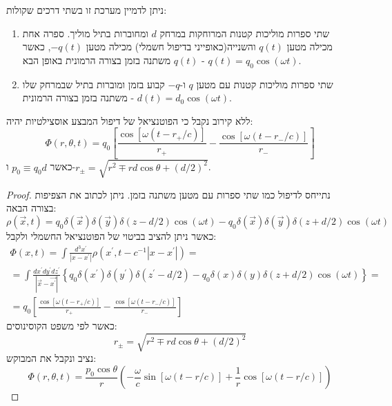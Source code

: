 \documentclass{tstextbook}
\begin{document}
\begin{definition}
ניתן לדמיין מערכת זו בשתי דרכים שקולות:

\end{definition}
\begin{enumerate}
  \item שתי ספרות מוליכות קטנות המרוחקות במרחק \(d\) ומחוברות בתיל מוליך. ספרה אחת מכילה מטען \(q(t)\) והשנייה(כאופייני בדיפול חשמלי) מכילה מטען \(-q(t)\), כאשר \(q(t)\) משתנה בזמן בצורה הרמונית באופן הבא - \(q(t)=q_{0}\cos\left( \omega t \right)\). 


  \item שתי ספרות מוליכות קטנות עם מטען \(q\) ו-\(-q\) קבוע בזמן ומוברות בתיל שבמרחק שלו משתנה בזמן בצורה הרמונית - \(d(t)=d_{0}\cos\left( \omega t \right)\). 


\end{enumerate}
\begin{proposition}
ללא קירוב נקבל כי הפוטנציאל של דיפול המבצע אוסצילטיות יהיה:
$$\Phi\left( r,\theta,t \right)=q_{0}\left[\frac{\cos[\omega(t-r_{+}/c)]}{r_{+}}-\frac{\cos[\omega(t-r_{-}/c)]}{r_{-}}\right]$$
כאשר \(p_{0}\equiv q_{0}d\) ו-\(r_{\pm}=\sqrt{r^{2}\mp r d\cos\theta+(d/2)^{2}}\).

\end{proposition}
\begin{proof}
נתייחס לדיפול כמו שתי ספרות עם מטען משתנה בזמן. ניתן לכתוב את הצפיפות בצורה הבאה:
$$\rho({\vec{x}},t)=q_{0}\delta({\vec{x}})\delta({\vec{y}})\delta(z-d/2)\cos(\omega t)-q_{0}\delta({\vec{x}})\delta({\vec{y}})\delta(z+d/2)\cos(\omega t)$$
כאשר ניתן להציב בביטוי של הפוטנציאל החשמלי ולקבל:
$$\begin{gather}\Phi(x,t)=\int\frac{d^{3}x^{\prime}}{|x-x^{\prime}|}\rho(x^{\prime},t-c^{-1}|x-x^{\prime}|)= \\=\int{\frac{d x^{\prime}d y^{\prime}d z^{\prime}}{|{\vec{x}}-{\vec{x^{\prime}}}|}}\left\{q_{0}\delta(x^{\prime})\delta(y^{\prime})\delta(z^{\prime}-d/2)-q_{0}\delta(x)\delta(y)\delta(z+d/2)\cos(\omega t)\right\}= \\=q_{0}\left[\frac{\cos[\omega(t-r_{+}/c)]}{r_{+}}-\frac{\cos[\omega(t-r_{-}/c)]}{r_{-}}\right]
\end{gather}$$
כאשר לפי משפט הקוסינוסים:
$$r_{\pm}=\sqrt{r^{2}\mp r d\cos\theta+(d/2)^{2}}$$
נציב ונקבל את המבוקש:
$$\Phi\left( r,\theta,t \right)={\frac{p_{0}\cos\theta}{r}}\left(-{\frac{\omega}{c}}\sin\left[ \omega(t-r/c) \right]+{\frac{1}{r}}\cos\left[ \omega(t-r/c) \right]\right)$$

\end{proof}
\end{document}
